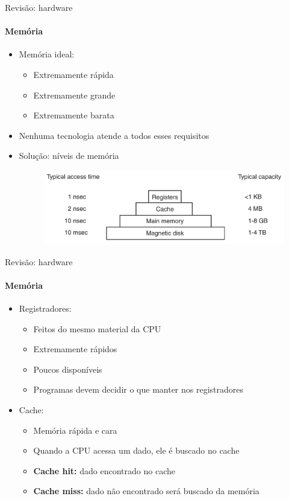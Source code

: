 \documentclass{beamer}
\begin{document}
\begin{frame}{Revisão: hardware}
	\framesubtitle{Memória}
	\begin{itemize}
		\item Memória ideal:
		\begin{itemize}
			\item Extremamente rápida
			\item Extremamente grande
			\item Extremamente barata
		\end{itemize}
		\item Nenhuma tecnologia atende a todos esses requisitos
		\item Solução: níveis de memória
		\begin{figure}
			\includegraphics[width=0.7\paperwidth]{resources/niveismem}
		\end{figure}
	\end{itemize}
\end{frame}
\begin{frame}{Revisão: hardware}
	\framesubtitle{Memória}
	\begin{itemize}
		\item Registradores:
		\begin{itemize}
			\item Feitos do mesmo material da CPU
			\item Extremamente rápidos
			\item Poucos disponíveis
			\item Programas devem decidir o que manter nos registradores
		\end{itemize}
		\item Cache:
		\begin{itemize}
			\item Memória rápida e cara
			\item Quando a CPU acessa um dado, ele é buscado no cache
			\item \textbf{Cache hit:} dado encontrado no cache
			\item \textbf{Cache miss:} dado não encontrado será buscado da memória
		\end{itemize}
	\end{itemize}
\end{frame}
\end{document}
